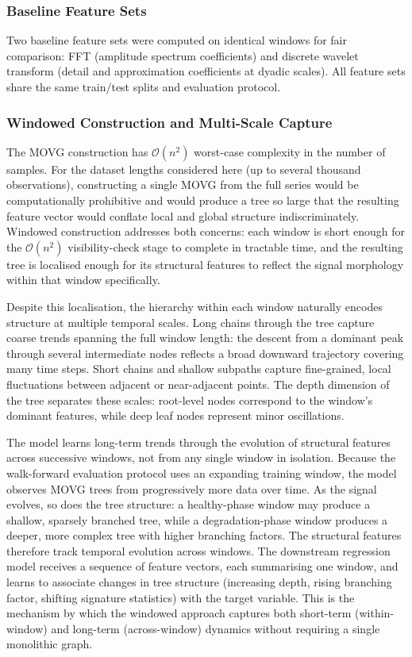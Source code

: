 \documentclass[a4paper,12pt]{article}
\begin{document}
\subsubsection{Baseline Feature Sets}

Two baseline feature sets were computed on identical windows for fair comparison: FFT (amplitude spectrum coefficients) and discrete wavelet transform (detail and approximation coefficients at dyadic scales). All feature sets share the same train/test splits and evaluation protocol.

\subsubsection{Windowed Construction and Multi-Scale Capture}

The MOVG construction has $\mathcal{O}(n^2)$ worst-case complexity in the number of samples. For the dataset lengths considered here (up to several thousand observations), constructing a single MOVG from the full series would be computationally prohibitive and would produce a tree so large that the resulting feature vector would conflate local and global structure indiscriminately. Windowed construction addresses both concerns: each window is short enough for the $\mathcal{O}(n^2)$ visibility-check stage to complete in tractable time, and the resulting tree is localised enough for its structural features to reflect the signal morphology within that window specifically.

Despite this localisation, the hierarchy within each window naturally encodes structure at multiple temporal scales. Long chains through the tree capture coarse trends spanning the full window length: the descent from a dominant peak through several intermediate nodes reflects a broad downward trajectory covering many time steps. Short chains and shallow subpaths capture fine-grained, local fluctuations between adjacent or near-adjacent points. The depth dimension of the tree separates these scales: root-level nodes correspond to the window's dominant features, while deep leaf nodes represent minor oscillations.

The model learns long-term trends through the evolution of structural features across successive windows, not from any single window in isolation. Because the walk-forward evaluation protocol uses an expanding training window, the model observes MOVG trees from progressively more data over time. As the signal evolves, so does the tree structure: a healthy-phase window may produce a shallow, sparsely branched tree, while a degradation-phase window produces a deeper, more complex tree with higher branching factors. The structural features therefore track temporal evolution across windows. The downstream regression model receives a sequence of feature vectors, each summarising one window, and learns to associate changes in tree structure (increasing depth, rising branching factor, shifting signature statistics) with the target variable. This is the mechanism by which the windowed approach captures both short-term (within-window) and long-term (across-window) dynamics without requiring a single monolithic graph.
\end{document}

